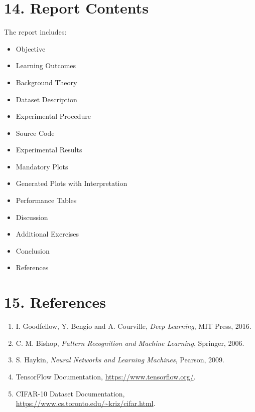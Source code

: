 \documentclass[11pt]{article}
\begin{document}
\section*{14. Report Contents}

The report includes:
\begin{itemize}
\item Objective
\item Learning Outcomes
\item Background Theory
\item Dataset Description
\item Experimental Procedure
\item Source Code
\item Experimental Results
\item Mandatory Plots
\item Generated Plots with Interpretation
\item Performance Tables
\item Discussion
\item Additional Exercises
\item Conclusion
\item References
\end{itemize}

\section*{15. References}

\begin{enumerate}
\item I. Goodfellow, Y. Bengio and A. Courville, \emph{Deep Learning}, MIT Press, 2016.
\item C. M. Bishop, \emph{Pattern Recognition and Machine Learning}, Springer, 2006.
\item S. Haykin, \emph{Neural Networks and Learning Machines}, Pearson, 2009.
\item TensorFlow Documentation, \url{https://www.tensorflow.org/}.
\item CIFAR-10 Dataset Documentation, \url{https://www.cs.toronto.edu/~kriz/cifar.html}.
\end{enumerate}
\end{document}
